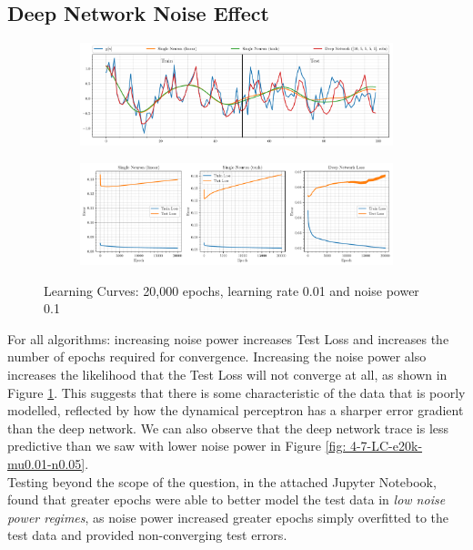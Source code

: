 \documentclass[12pt]{article}
\numberwithin{equation}{section}
\begin{document}
	\subsection{Deep Network Noise Effect} \label{sec: 4-7-DL-noise}
		\vspace*{-0.8\baselineskip}
		\begin{figure}[H]
			\centering
			\begin{subfigure}{\textwidth}
				\centering
				\includegraphics[width=\textwidth]{../Python/figures/Q4_LMS2DL_4_7+8_06.pdf} 
				\captionsetup{justification=centering}
			\end{subfigure}
			\begin{subfigure}{\textwidth}
				\centering
				\includegraphics[width=\textwidth]{../Python/figures/Q4_LMS2DL_4_7+8_21.pdf} 
				\captionsetup{justification=centering}
			\end{subfigure}
			
			\captionsetup{justification=centering}
			\caption{Learning Curves: 20,000 epochs, learning rate 0.01 and noise power 0.1}
			\label{fig: 4-7-LC-e20k-mu0.01-n0.1}
		\end{figure}
		For all algorithms: increasing noise power increases Test Loss and increases the number of epochs required for convergence. Increasing the noise power also increases the likelihood that the Test Loss will not converge at all, as shown in Figure \ref{fig: 4-7-LC-e20k-mu0.01-n0.1}. This suggests that there is some characteristic of the data that is poorly modelled, reflected by how the dynamical perceptron has a sharper error gradient than the deep network. We can also observe that the deep network trace is less predictive than we saw with lower noise power in Figure \ref{fig: 4-7-LC-e20k-mu0.01-n0.05}. \\
		Testing beyond the scope of the question, in the attached Jupyter Notebook, found that greater epochs were able to better model the test data in \textit{low noise power regimes}, as noise power increased greater epochs simply overfitted to the test data and provided non-converging test errors.
		
\end{document}
